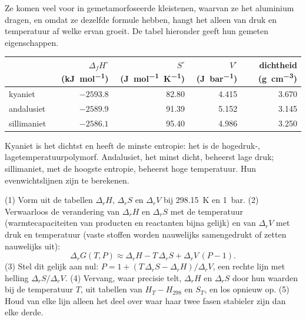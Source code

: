 Ze komen veel voor in gemetamorfoseerde kleistenen, waarvan ze het aluminium dragen, en omdat ze
dezelfde formule hebben, hangt het alleen van druk en temperatuur af welke ervan groeit. De tabel
hieronder geeft hun gemeten eigenschappen.

\begin{center}
\small
\begin{tabular}{@{}lrrrr@{}}
\hline
 & $\Delta_f H^\circ$ (\unit{kJ.mol^{-1}}) & $S^\circ$ (\unit{J.mol^{-1}.K^{-1}}) & $V^\circ$ (\unit{J.bar^{-1}}) & dichtheid (\unit{g.cm^{-3}})\\
\hline
kyaniet & $-2593.8$ & 82.80 & 4.415 & 3.670\\
andalusiet & $-2589.9$ & 91.39 & 5.152 & 3.145\\
sillimaniet & $-2586.1$ & 95.40 & 4.986 & 3.250\\
\hline
\end{tabular}
\par{}
\end{center}

Kyaniet is het dichtst en heeft de minste entropie: het is de hogedruk-,
lagetemperatuurpolymorf. Andalusiet, het minst dicht, beheerst lage druk; sillimaniet,
met de hoogste entropie, beheerst hoge temperatuur. Hun evenwichtslijnen zijn te berekenen.

\begin{method}\label{met:b2:metamorphic-facies:line}
(1) Vorm uit de tabellen $\Delta_r H$, $\Delta_r S$ en $\Delta_r V$ bij \qty{298.15}{K}
en \qty{1}{bar}. (2) Verwaarloos de verandering van $\Delta_r H$ en $\Delta_r S$ met de
temperatuur (warmtecapaciteiten van producten en reactanten bijna gelijk) en van $\Delta_r V$
met druk en temperatuur (vaste stoffen worden nauwelijks samengedrukt of zetten nauwelijks uit):
\[
\Delta_r G(T, P) \approx \Delta_r H - T\,\Delta_r S + \Delta_r V\,(P - 1).
\]
(3) Stel dit gelijk aan nul: $P = 1 + (T\,\Delta_r S - \Delta_r H)/\Delta_r V$, een rechte lijn met
helling $\Delta_r S/\Delta_r V$. (4) Vervang, waar precisie telt, $\Delta_r H$ en
$\Delta_r S$ door hun waarden bij de temperatuur $T$, uit tabellen van $H_T - H_{298}$ en $S_T$,
en los opnieuw op. (5) Houd van elke lijn alleen het deel over waar haar twee fasen stabieler zijn
dan elke derde.
\end{method}

